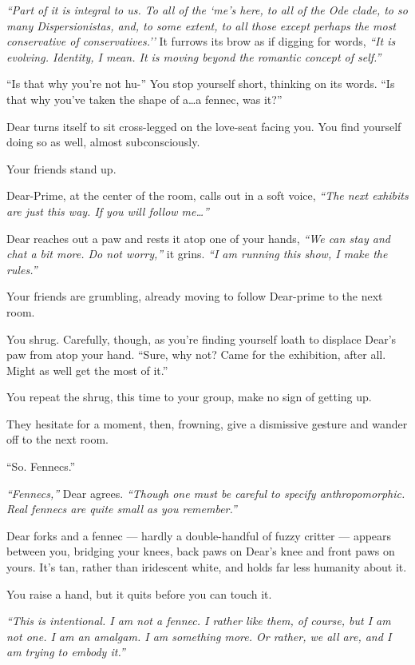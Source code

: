 \emph{``Part of it is integral to us. To all of the `me's here, to all of the Ode clade, to so many Dispersionistas, and, to some extent, to all those except perhaps the most conservative of conservatives.''} It furrows its brow as if digging for words, \emph{``It is evolving. Identity, I mean. It is moving beyond the romantic concept of self.''}

``Is that why you're not hu-'' You stop yourself short, thinking on its words. ``Is that why you've taken the shape of a\ldots{}a fennec, was it?''

Dear turns itself to sit cross-legged on the love-seat facing you. You find yourself doing so as well, almost subconsciously.

Your friends stand up.

Dear-Prime, at the center of the room, calls out in a soft voice, \emph{``The next exhibits are just this way. If you will follow me\ldots{}''}

Dear reaches out a paw and rests it atop one of your hands, \emph{``We can stay and chat a bit more. Do not worry,''} it grins. \emph{``I am running this show, I make the rules.''}

Your friends are grumbling, already moving to follow Dear-prime to the next room.


You shrug. Carefully, though, as you're finding yourself loath to displace Dear's paw from atop your hand. ``Sure, why not? Came for the exhibition, after all. Might as well get the most of it.''

You repeat the shrug, this time to your group, make no sign of getting up.

They hesitate for a moment, then, frowning, give a dismissive gesture and wander off to the next room.

``So. Fennecs.''

\emph{``Fennecs,''} Dear agrees. \emph{``Though one must be careful to specify anthropomorphic. Real fennecs are quite small as you remember.''}

Dear forks and a fennec --- hardly a double-handful of fuzzy critter --- appears between you, bridging your knees, back paws on Dear's knee and front paws on yours. It's tan, rather than iridescent white, and holds far less humanity about it.

You raise a hand, but it quits before you can touch it.

\emph{``This is intentional. I am not a fennec. I rather like them, of course, but I am not one. I am an amalgam. I am something more. Or rather, we all are, and I am trying to embody it.''}

